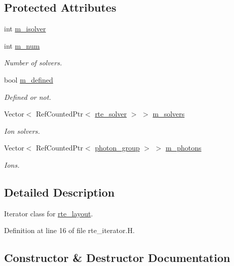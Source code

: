 \subsection*{Protected Attributes}
\begin{DoxyCompactItemize}
\item 
int \hyperlink{classrte__iterator_a726e2877a36971beb8940c8ed8d62452}{m\+\_\+isolver}
\item 
int \hyperlink{classrte__iterator_a6bb36bf3c9c2b9249917218857918aa3}{m\+\_\+num}
\begin{DoxyCompactList}\small\item\em Number of solvers. \end{DoxyCompactList}\item 
bool \hyperlink{classrte__iterator_a833f9ee5fcacd8892fb4bf30471c36e5}{m\+\_\+defined}
\begin{DoxyCompactList}\small\item\em Defined or not. \end{DoxyCompactList}\item 
Vector$<$ Ref\+Counted\+Ptr$<$ \hyperlink{classrte__solver}{rte\+\_\+solver} $>$ $>$ \hyperlink{classrte__iterator_a451dec739a34d23dd700a3153bbbf3d4}{m\+\_\+solvers}
\begin{DoxyCompactList}\small\item\em Ion solvers. \end{DoxyCompactList}\item 
Vector$<$ Ref\+Counted\+Ptr$<$ \hyperlink{classphoton__group}{photon\+\_\+group} $>$ $>$ \hyperlink{classrte__iterator_a1f53fbecae6089bf284cf7479057b229}{m\+\_\+photons}
\begin{DoxyCompactList}\small\item\em Ions. \end{DoxyCompactList}\end{DoxyCompactItemize}


\subsection{Detailed Description}
Iterator class for \hyperlink{classrte__layout}{rte\+\_\+layout}. 

Definition at line 16 of file rte\+\_\+iterator.\+H.



\subsection{Constructor \& Destructor Documentation}
